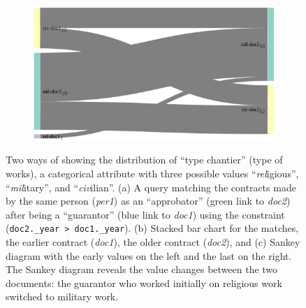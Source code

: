 \begin{figure}[!ht]
\begin{subfigure}[b]{0.3\linewidth}
    \caption{}
    \end{subfigure}
    \begin{subfigure}[b]{0.44\linewidth}
    \includegraphics[width=\textwidth]{static/figures/ComBiNet/OriginalPaperFigures/CGF/sankeyPLot/sankey_bigger.pdf}
    \caption{}
    \end{subfigure}
    \caption{Two ways of showing the distribution of ``type chantier'' (type of works), a categorical attribute with three possible values ``\textsl{rel}igious'', ``\textsl{mil}itary'', and ``\textsl{civ}ilian''.
    (a) A query matching the contracts made by the same person (\textit{per1}) as an ``approbator'' (green link to \textit{doc2}) after being a ``guarantor'' (blue link to \textit{doc1}) using the constraint (\texttt{doc2.\_year > doc1.\_year}). (b) Stacked bar chart for the matches, the earlier contract (\textit{doc1}), the older contract (\textit{doc2}), and (c) Sankey diagram with the early values on the left and the last on the right.
    The Sankey diagram reveals the value changes between the two documents: the guarantor who worked initially on religious work switched to military work.} \label{fig:sankeys}
\end{figure}

